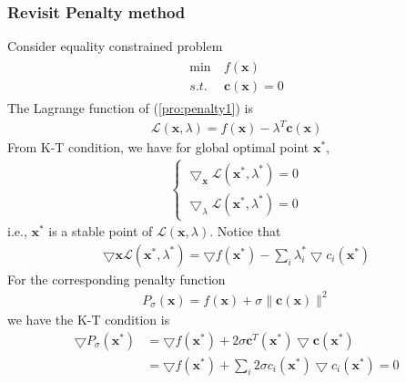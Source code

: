 \subsubsection{Revisit Penalty method}
Consider equality constrained problem
\begin{align}
    \begin{array}{ll}
        \min \ &f(\mathbf{x}) \\
        s.t. \ &\mathbf{c}(\mathbf{x}) = 0
    \end{array}
    \label{pro:penalty1}
\end{align}
The Lagrange function of (\ref{pro:penalty1}) is
\begin{align}
    \mathcal{L}(\mathbf{x}, \lambda) = 
    f(\mathbf{x}) - \lambda^T \mathbf{c}(\mathbf{x})
\end{align}
From K-T condition, we have for global optimal point
$\mathbf{x}^*$,
\begin{align}
    \left\{
        \begin{array}{ll}
            \bigtriangledown_{\mathbf{x}} \mathcal{L}
            (\mathbf{x}^*, \lambda^*) = 0 \\
            \bigtriangledown_{\lambda} \mathcal{L}
            (\mathbf{x}^*, \lambda^*) = 0
        \end{array}
        \right.
\end{align}
i.e., $\mathbf{x}^*$ is a stable point of
$\mathcal{L}(\mathbf{x}, \lambda)$.
Notice that
\begin{align}
    \bigtriangledown{\mathbf{x}} \mathcal{L}
    (\mathbf{x}^*, \lambda^*) = 
    \bigtriangledown f(\mathbf{x}^*) - 
    \sum_i \lambda_i^* \bigtriangledown c_i(\mathbf{x}^*)
    \label{equ:penalty1}
\end{align}
For the corresponding penalty function
\begin{align}
    P_\sigma (\mathbf{x}) =
    f(\mathbf{x}) + \sigma \parallel
    \mathbf{c}(\mathbf{x}) \parallel^2
\end{align}
we have the K-T condition is
\begin{align}
    \bigtriangledown P_\sigma (\mathbf{x}^*) &= 
    \bigtriangledown f(\mathbf{x}^*) + 
    2\sigma \mathbf{c}^T(\mathbf{x}^*) 
    \bigtriangledown \mathbf{c}(\mathbf{x}^*) \\
    &= 
    \bigtriangledown f(\mathbf{x}^*) + 
    \sum_i 2\sigma c_i(\mathbf{x}^*) 
    \bigtriangledown c_i(\mathbf{x}^*) = 0
    \label{equ:penalty2}
\end{align}


